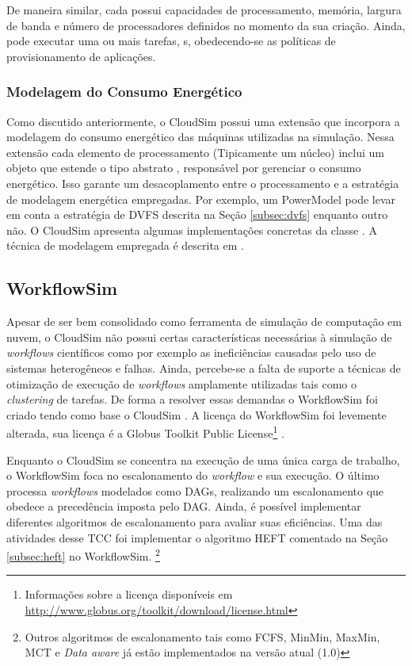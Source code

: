 De maneira similar, cada  possui capacidades de processamento, memória,
largura de banda e número de processadores definidos no momento da sua criação.
Ainda, pode executar uma ou mais tarefas, s, obedecendo-se as
políticas de provisionamento de aplicações.

\subsubsection{Modelagem do Consumo Energético}
Como discutido anteriormente, o CloudSim possui uma extensão que incorpora 
a modelagem do consumo energético das máquinas utilizadas na simulação. Nessa 
extensão cada elemento de processamento (Tipicamente um núcleo) inclui um
objeto que estende o tipo abstrato , responsável por gerenciar o
consumo energético. Isso garante um desacoplamento entre o processamento e 
a estratégia de modelagem energética empregadas. Por exemplo,
um PowerModel pode levar em conta a estratégia de DVFS descrita na Seção 
\ref{subsec:dvfs} enquanto outro não. O CloudSim apresenta algumas implementações
concretas da classe . A técnica de modelagem empregada é descrita
em \cite{beloglazov:cloudsim_power}.


\subsection{WorkflowSim}
\label{subsec:workflowsim}
Apesar de ser bem consolidado como ferramenta de simulação de computação em nuvem,
o CloudSim não possui certas características necessárias à simulação de 
\emph{workflows} científicos como por exemplo as ineficiências causadas pelo
uso de sistemas heterogêneos e falhas. Ainda, percebe-se a falta de suporte a 
técnicas de otimização de execução de \emph{workflows} amplamente utilizadas
tais como o \emph{clustering} de tarefas. De forma a resolver essas demandas
o WorkflowSim foi criado tendo como base o CloudSim \cite{chen:workflowsim}.
A licença do WorkflowSim foi levemente alterada, sua licença é a Globus Toolkit
Public License\footnote{Informações sobre a licença disponíveis em 
\url{http://www.globus.org/toolkit/download/license.html}}
\cite{workflowsim:license}.

Enquanto o CloudSim se concentra na execução de uma única carga de trabalho,
o WorkflowSim foca no escalonamento do \emph{workflow} e sua execução. O último
processa \emph{workflows} modelados como DAGs, realizando um escalonamento que 
obedece a precedência imposta pelo DAG. Ainda, é possível implementar diferentes
algoritmos de escalonamento para avaliar suas eficiências. Uma das atividades desse
TCC foi implementar o algoritmo HEFT comentado na Seção \ref{subsec:heft} no 
WorkflowSim. \footnote{Outros algoritmos de escalonamento tais como FCFS, 
MinMin, MaxMin, MCT e \emph{Data aware} já estão implementados na versão atual
(1.0)}

